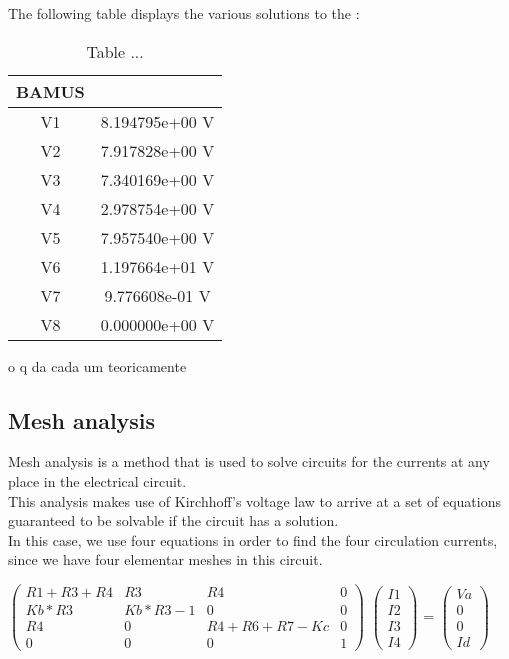 The following table displays the various solutions to the :

\begin{table}[ht]
\centering
\begin{tabular}{c|c} 
 \hline
 BAMUS\\ [0.5ex] 
 \hline\hline
V1 & 8.194795e+00 V\\ \hline
V2 & 7.917828e+00 V\\ \hline
V3 & 7.340169e+00 V\\ \hline
V4 & 2.978754e+00 V\\ \hline
V5 & 7.957540e+00 V\\ \hline
V6 & 1.197664e+01 V\\ \hline
V7 & 9.776608e-01 V\\ \hline
V8 & 0.000000e+00 V\\ \hline 
\end{tabular}
\caption{Table ...}
\label{table:2}
\end{table}

o q da cada um teoricamente

\subsection{Mesh analysis}

Mesh analysis is a method that is used to solve circuits for the currents at any place in the electrical circuit.\\
This analysis makes use of Kirchhoff’s voltage law to arrive at a set of equations guaranteed to be solvable if the circuit has a solution.\\In this case, we use four equations in order to find the four circulation currents, since we have four elementar meshes in this circuit.

$\begin{pmatrix}
R1+R3+R4 & R3 & R4 & 0 \\
Kb*R3 & Kb*R3 - 1 & 0 & 0 \\
R4 & 0 & R4+R6+R7-Kc & 0 \\
0 & 0 & 0 & 1 
\end{pmatrix}$
$\begin{pmatrix}
I1\\
I2\\
I3\\
I4
\end{pmatrix}$
=
$\begin{pmatrix}
Va\\
0\\
0\\
Id
\end{pmatrix}$


